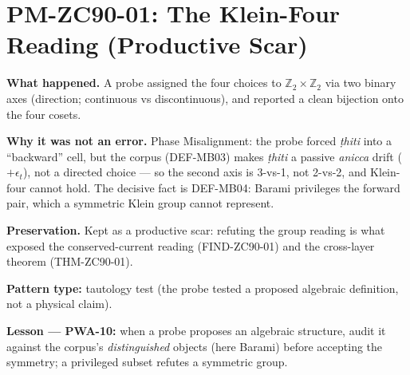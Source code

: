 \documentclass[12pt, a4paper]{article}
\begin{document}
\section{PM-ZC90-01: The Klein-Four Reading (Productive Scar)}
\label{sec:pm-zc90}

\begin{derivedbox}[title={PM-ZC90-01: $\mathcal{C}_4$ as Klein-Four
  $\mathbb{Z}_2\times\mathbb{Z}_2$ (Failure Stance)}]
\textbf{What happened.} A probe assigned the four choices to
$\mathbb{Z}_2\times\mathbb{Z}_2$ via two binary axes (direction; continuous vs
discontinuous), and reported a clean bijection onto the four cosets.

\textbf{Why it was not an error.} Phase Misalignment: the probe forced
\emph{ṭhiti} into a ``backward'' cell, but the corpus (DEF-MB03) makes
\emph{ṭhiti} a passive \emph{anicca} drift ($+\epsilon_t$), not a directed
choice --- so the second axis is 3-vs-1, not 2-vs-2, and Klein-four
cannot hold. The decisive fact is DEF-MB04: Barami privileges the forward
pair, which a symmetric Klein group cannot represent.

\textbf{Preservation.} Kept as a productive scar: refuting the group
reading is what exposed the conserved-current reading (FIND-ZC90-01) and
the cross-layer theorem (THM-ZC90-01).

\textbf{Pattern type:} tautology test (the probe tested a proposed
algebraic definition, not a physical claim).

\textbf{Lesson --- PWA-10:} when a probe proposes an algebraic structure,
audit it against the corpus's \emph{distinguished} objects (here Barami)
before accepting the symmetry; a privileged subset refutes a symmetric
group.
\end{derivedbox}
\end{document}
